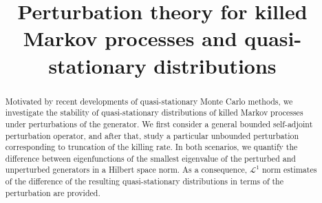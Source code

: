 \documentclass{aptpub}
\begin{document}

\title{Perturbation theory for killed Markov processes and quasi-stationary distributions} %




\begin{abstract}
 Motivated by recent developments of quasi-stationary Monte Carlo methods, we investigate the stability of quasi-stationary distributions of killed Markov processes under perturbations of the generator. 
    We first consider a general bounded self-adjoint perturbation operator, and after that, study a particular unbounded perturbation corresponding to truncation of the killing rate.
    In both scenarios, we quantify the difference between eigenfunctions of the smallest eigenvalue of the perturbed and unperturbed generators in a Hilbert space norm. As a consequence, $\mathcal{L}^1$ norm estimates of the difference of the resulting quasi-stationary distributions in terms of the perturbation are provided.
\end{abstract}



\end{document}
